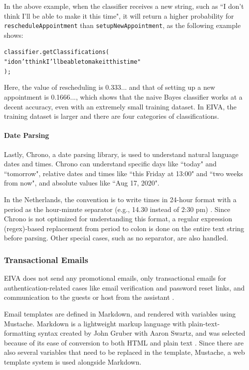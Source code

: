 \documentclass{article}
\begin{document}
In the above example, when the classifier receives a new string, such as ``I don't think I'll be able to make it this time", it will return a higher probability for \texttt{rescheduleAppointment} than \texttt{setupNewAppointment}, as the following example shows:

\begin{alltt}
classifier.\textcolor{variable}{getClassifications}(
  \textcolor{string}{"i don't think I'll be able to make it this time"}
);
\end{alltt}

Here, the value of rescheduling is 0.333... and that of setting up a new appointment is 0.1666..., which shows that the naive Bayes classifier works at a decent accuracy, even with an extremely small training dataset. In EIVA, the training dataset is larger and there are four categories of classifications.

\paragraph{Date Parsing}

Lastly, Chrono, a date parsing library, is used to understand natural language dates and times. Chrono can understand specific days like ``today" and ``tomorrow", relative dates and times like ``this Friday at 13:00" and ``two weeks from now", and absolute values like ``Aug 17, 2020".

In the Netherlands, the convention is to write times in 24-hour format with a period as the hour-minute separator (e.g., 14.30 instead of 2:30 pm) \cite{noauthor_8h30_nodate}. Since Chrono is not optimized for understanding this format, a regular expression (regex)-based replacement from period to colon is done on the entire text string before parsing. Other special cases, such as no separator, are also handled.

\subsubsection{Transactional Emails}

EIVA does not send any promotional emails, only transactional emails for authentication-related cases like email verification and password reset links, and communication to the guests or host from the assistant \cite{noauthor_everything_2018}.

Email templates are defined in Markdown, and rendered with variables using Mustache. Markdown is a lightweight markup language with plain-text-formatting syntax created by John Gruber with Aaron Swartz, and was selected because of its ease of conversion to both HTML and plain text \cite{noauthor_daring_nodate}. Since there are also several variables that need to be replaced in the template, Mustache, a web template system is used alongside Markdown.
\end{document}
